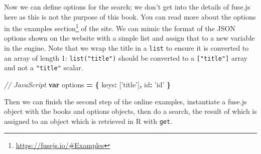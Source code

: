 \documentclass[10pt,]{krantz}
\makeatletter
\newenvironment{Shaded}{\begin{snugshade}}{\end{snugshade}}
\newcommand{\CommentTok}[1]{\textcolor[rgb]{0.37,0.37,0.37}{\textit{#1}}}
\newcommand{\DataTypeTok}[1]{\textcolor[rgb]{0.27,0.27,0.27}{#1}}
\newcommand{\KeywordTok}[1]{\textcolor[rgb]{0.27,0.27,0.27}{\textbf{#1}}}
\newcommand{\NormalTok}[1]{#1}
\newcommand{\OperatorTok}[1]{\textcolor[rgb]{0.43,0.43,0.43}{\textbf{#1}}}
\newcommand{\StringTok}[1]{\textcolor[rgb]{0.5,0.5,0.5}{#1}}
\renewcommand{\href}[2]{#2\footnote{\url{#1}}}
\newenvironment{kframe}{%
\medskip{}
\setlength{\fboxsep}{.8em}
 \def\at@end@of@kframe{}%
 \ifinner\ifhmode%
  \def\at@end@of@kframe{\end{minipage}}%
  \begin{minipage}{\columnwidth}%
 \fi\fi%
 \def\FrameCommand##1{\hskip\@totalleftmargin \hskip-\fboxsep
 \colorbox{shadecolor}{##1}\hskip-\fboxsep
     \hskip-\linewidth \hskip-\@totalleftmargin \hskip\columnwidth}%
 \MakeFramed {\advance\hsize-\width
   \@totalleftmargin\z@ \linewidth\hsize
   \@setminipage}}%
 {\par\unskip\endMakeFramed%
 \at@end@of@kframe}
\renewenvironment{Shaded}{\begin{kframe}}{\end{kframe}}
\makeatother
\begin{document}
Now we can define options for the search; we don't get into the details of fuse.js here as this is not the purpose of this book. You can read more about the options in the \href{https://fusejs.io/\#Examples}{examples section} of the site. We can mimic the format of the JSON options shown on the website with a simple list and assign that to a new variable in the engine. Note that we wrap the title in a \texttt{list} to ensure it is converted to an array of length 1: \texttt{list("title")} should be converted to a \texttt{{[}"title"{]}} array and not a \texttt{"title"} scalar.

\begin{Shaded}
\begin{Highlighting}[]
\CommentTok{// JavaScript}
\KeywordTok{var}\NormalTok{ options }\OperatorTok{=} \OperatorTok{\{}
  \DataTypeTok{keys}\OperatorTok{:}\NormalTok{ [}\StringTok{'title'}\NormalTok{]}\OperatorTok{,}
  \DataTypeTok{id}\OperatorTok{:} \StringTok{'id'}
\OperatorTok{\}}
\end{Highlighting}
\end{Shaded}

\begin{Shaded}
\end{Shaded}

Then we can finish the second step of the online examples, instantiate a fuse.js object with the books and options objects, then do a search, the result of which is assigned to an object which is retrieved in R with \texttt{get}.

\begin{Shaded}
\end{Shaded}
\end{document}
